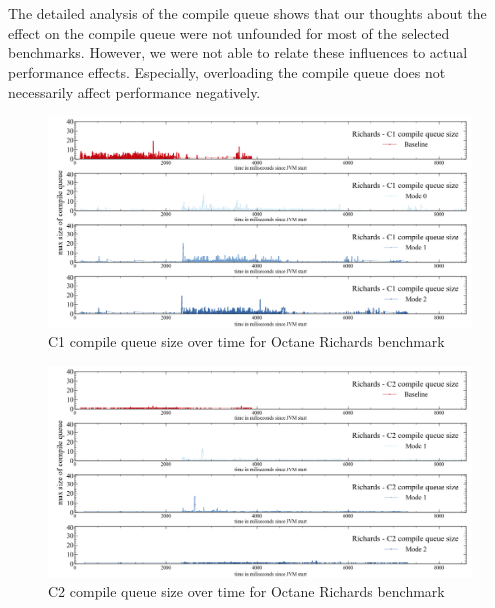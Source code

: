\\\\
The detailed analysis of the compile queue shows that our thoughts about the effect on the compile queue were not unfounded for most of the selected benchmarks. However, we were not able to relate these influences to actual performance effects. Especially, overloading the compile queue does not necessarily affect performance negatively.
\begin{figure}[ht]
  \begin{center}
    \centering
    \includegraphics[width=1.0\textwidth]{figures/octane_queue_richards_separate_c1.png}
    \caption{C1 compile queue size over time for Octane Richards benchmark}
    \label{f:octane_queue_richards_separate_c1}
  \end{center}
\end{figure}
\begin{figure}[ht]
  \begin{center}
    \centering
    \includegraphics[width=1.0\textwidth]{figures/octane_queue_richards_separate_c2.png}
    \caption{C2 compile queue size over time for Octane Richards benchmark}
    \label{f:octane_queue_richards_separate_c2}
  \end{center}
\end{figure}
